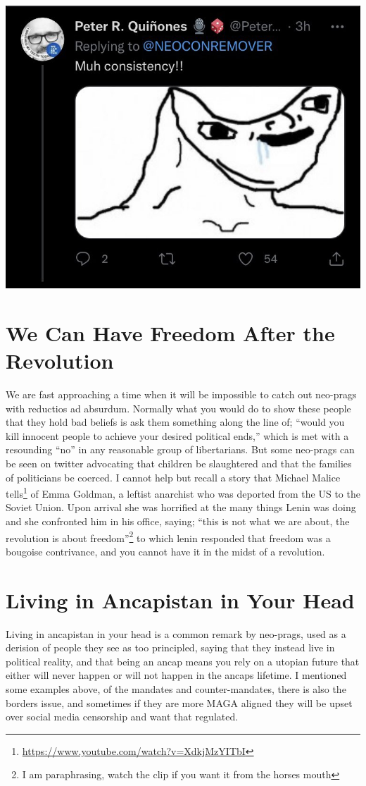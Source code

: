 \documentclass[11pt]{article}
\begin{document}
\begin{center}
\includegraphics[width=.9\linewidth]{./images/quinones-against-logic.jpg}
\end{center}

\section{We Can Have Freedom After the Revolution}
\label{sec:orgb70973b}
We are fast approaching a time when it will be impossible to catch out neo-prags with reductios ad absurdum. Normally what you would do to show these people that they hold bad beliefs is ask them something along the line of; ``would you kill innocent people to achieve your desired political ends,'' which is met with a resounding ``no'' in any reasonable group of libertarians. But some neo-prags can be seen on twitter advocating that children be slaughtered and that the families of politicians be coerced. I cannot help but recall a story that Michael Malice tells\footnote{\url{https://www.youtube.com/watch?v=XdkjMzYITbI}} of Emma Goldman, a leftist anarchist who was deported from the US to the Soviet Union. Upon arrival she was horrified at the many things Lenin was doing and she confronted him in his office, saying; ``this is not what we are about, the revolution is about freedom''\footnote{I am paraphrasing, watch the clip if you want it from the horses mouth} to which lenin responded that freedom was a bougoise contrivance, and you cannot have it in the midst of a revolution.

\section{Living in Ancapistan in Your Head}
\label{sec:org95d4240}
Living in ancapistan in your head is a common remark by neo-prags, used as a derision of people they see as too principled, saying that they instead live in political reality, and that being an ancap means you rely on a utopian future that either will never happen or will not happen in the ancaps lifetime. I mentioned some examples above, of the mandates and counter-mandates, there is also the borders issue, and sometimes if they are more MAGA aligned they will be upset over social media censorship and want that regulated.
\end{document}
